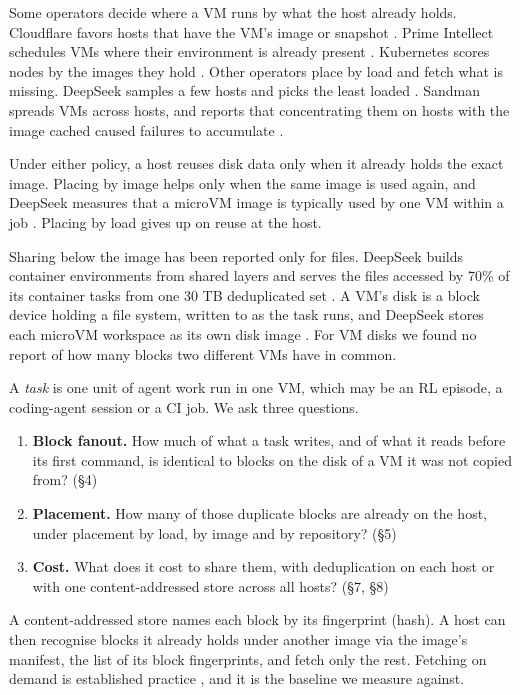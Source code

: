 \documentclass[10pt,twocolumn]{article}
\begin{document}
Some operators decide where a VM runs by what the host already holds. Cloudflare favors hosts that have the VM's image or snapshot \cite{cloudflare-sandboxes}. Prime Intellect schedules VMs where their environment is already present \cite{prime-sandboxes}. Kubernetes scores nodes by the images they hold \cite{k8s-imagelocality}. Other operators place by load and fetch what is missing. DeepSeek samples a few hosts and picks the least loaded \cite{dsec}. Sandman spreads VMs across hosts, and reports that concentrating them on hosts with the image cached caused failures to accumulate \cite{sandman}.

Under either policy, a host reuses disk data only when it already holds the exact image. Placing by image helps only when the same image is used again, and DeepSeek measures that a microVM image is typically used by one VM within a job \cite{dsec}. Placing by load gives up on reuse at the host.

Sharing below the image has been reported only for files. DeepSeek builds container environments from shared layers and serves the files accessed by 70\% of its container tasks from one 30 TB deduplicated set \cite{dsec}. A VM's disk is a block device holding a file system, written to as the task runs, and DeepSeek stores each microVM workspace as its own disk image \cite{dsec}. For VM disks we found no report of how many blocks two different VMs have in common.

A \emph{task} is one unit of agent work run in one VM, which may be an RL episode, a coding-agent session or a CI job. We ask three questions.

\begin{enumerate}
\item \textbf{Block fanout.} How much of what a task writes, and of what it reads before its first command, is identical to blocks on the disk of a VM it was not copied from? (\S4)

\item \textbf{Placement.} How many of those duplicate blocks are already on the host, under placement by load, by image and by repository? (\S5)

\item \textbf{Cost.} What does it cost to share them, with deduplication on each host or with one content-addressed store across all hosts? (\S7, \S8)

\end{enumerate}

A content-addressed store names each block by its fingerprint (hash). A host can then recognise blocks it already holds under another image via the image's manifest, the list of its block fingerprints, and fetch only the rest. Fetching on demand is established practice \cite{lambda,dsec}, and it is the baseline we measure against.
\end{document}
